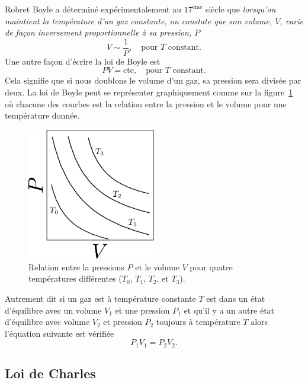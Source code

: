 \documentclass[a4paper,12pt]{book}
\begin{document}
Robret Boyle a déterminé expérimentalement au $17^\textrm{\`eme}$
siècle que \textit{lorsqu'on maintient la température d'un gaz constante, on constate que son volume, $V$, varie de façon inversement proportionnelle à sa pression, $P$}
\begin{equation}
V\sim\frac{1}{P},\quad \mbox{pour }T\mbox{ constant.}
\end{equation}
Une autre façon d'écrire la loi de Boyle est 
\begin{equation}
PV= \mbox{cte},\quad \mbox{pour }T\mbox{ constant.}\label{eq_loi_boyle}
\end{equation}
Cela signifie que si nous doublons le volume d'un gaz, sa pression sera divisée par deux. La loi de Boyle peut se représenter graphiquement comme sur la figure~\ref{fig_boyle}
où chacune des courbes est la relation entre la pression et le volume pour une température donnée.
\begin{figure}
\begin{center}
\includegraphics[width=0.5\textwidth]{figs/boyle.pdf}
\caption{Relation entre la pressions $P$ et le volume $V$ pour quatre températures différentes ($T_0$, $T_1$, $T_2$, et $T_3$).}
\label{fig_boyle}
\end{center}
\end{figure}
Autrement dit si un gaz est à température constante $T$ est dans un état d'équilibre avec un volume $V_1$ et
une pression $P_1$ et qu'il y a un autre état d'équilibre avec volume $V_2$ et pression $P_2$ toujours à température $T$ alors l'équation suivante est vérifiée
\begin{equation}
P_1V_1=P_2V_2.
\end{equation}

\subsection{Loi de Charles}
\end{document}
